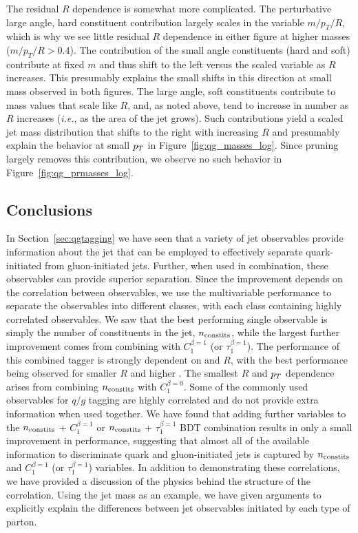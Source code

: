 The residual $R$ dependence is somewhat more complicated.  
The perturbative large angle, hard constituent contribution
largely scales in the variable $m/p_T/R$, which is why we see little residual $R$ dependence in either figure at higher masses ($m/p_T/R > 0.4$).  
The contribution of the small angle constituents (hard and soft) contribute at fixed $m$ and thus shift to the left versus the scaled variable as $R$ increases.  
This presumably explains the small shifts in this direction at small mass observed in both figures.
The large angle, soft constituents contribute to mass values that scale like $R$, and, as noted above, tend to increase in number as $R$ increases 
(\textit{i.e.}, as the area of the jet grows).  Such contributions  yield a scaled jet mass
distribution that shifts to the right with increasing $R$  and presumably explain the behavior at small $p_T$ in Figure~\ref{fig:qg_masses_log}.  Since pruning
largely removes this contribution, we observe no such behavior in Figure~\ref{fig:qg_prmasses_log}. 

 \subsection{Conclusions}\label{sec:qg_concl}

In Section~\ref{sec:qgtagging} we have seen that a variety of jet observables
 provide information about the jet that can be employed  to effectively separate quark-initiated from gluon-initiated jets.  Further,
when used in combination, these observables can provide superior separation. Since the improvement depends on the correlation between observables,
we use the multivariable performance to separate the observables into different classes, with each class containing highly correlated observables.  
We saw that the best performing single observable is simply the number of
constituents in the jet, $n_ {\rm constits}$,  while the largest
further improvement comes from combining with $C_1^{\beta =1}$ (or
$\tau_1^{\beta=1}$). The performance of this combined tagger is
strongly dependent on \pt and $R$, with the best performance being
observed for smaller $R$ and higher \pt. The smallest
$R$ and $p_T$ dependence arises from combining $n_ {\rm constits}$ with $C_1^{\beta =
  0}$. Some of the commonly used observables for $q/g$ tagging are highly correlated
and do not provide extra information when used together. 
We have found that adding further variables to the $n_ {\rm constits}$
+ $C_1^{\beta =1}$  or $n_ {\rm constits}$
+ $\tau_1^{\beta =1}$ BDT combination
results in only a small improvement in performance, suggesting that almost all of the available information to
discriminate quark and gluon-initiated jets is captured by $n_{\rm
  constits}$ and $C_1^{\beta=1}$ (or $\tau_1^{\beta=1}$)
variables. In addition to demonstrating these correlations, we have provided a discussion of the 
physics behind the structure of the correlation.  Using the jet mass as an example, we have given arguments to explicitly explain the differences between jet observables 
initiated by each type of parton. 


